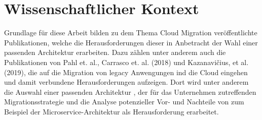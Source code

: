 \section{Wissenschaftlicher Kontext}

Grundlage für diese Arbeit bilden zu dem Thema Cloud Migration veröffentlichte Publikationen, welche die Herausforderungen
dieser in Anbetracht der Wahl einer passenden Architektur erarbeiten. Dazu zählen unter anderem auch die Publikationen
von Pahl et. al., Carrasco et. al. (2018) und Kazanavičius, et al. (2019), die auf die Migration von legacy Anwengungen
ind die Cloud eingehen und damit verbundene Herausforderungen aufzeigen. Dort wird unter anderem die Auswahl einer
passenden Architektur \cite[Vgl.][S. 14]{Pahl}, der für das Unternehmen zutreffenden Migrationsstrategie
\cite[Vgl.][S. 4]{Kazanavicius2019} und die Analyse potenzieller Vor- und Nachteile von zum Beispiel der
Microservice-Architektur \cite[Vgl.][S. 3]{Carrasco2018} als Herausforderung erarbeitet.